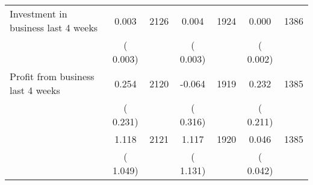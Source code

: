 \documentclass[10pt,a4paper]{article}
\begin{document}
\begin{table}
\begin{tabular}{l*{6}{c}}
Investment in business last 4 weeks        &              0.003      &       2126       &              0.004      &       1924       &              0.000      &       1386       \\
                       &       (       0.003)            &                               &       (       0.003)            &                               &       (       0.002)            &                               \\
Profit from business last 4 weeks        &              0.254      &       2120       &             -0.064      &       1919       &              0.232      &       1385       \\
                       &       (       0.231)            &                               &       (       0.316)            &                               &       (       0.211)            &                               \\
        &              1.118      &       2121       &              1.117      &       1920       &              0.046      &       1385       \\
                       &       (       1.049)            &                               &       (       1.131)            &                               &       (       0.042)            &                               \\
\hline \end{tabular}

\end{table}
\end{document}
